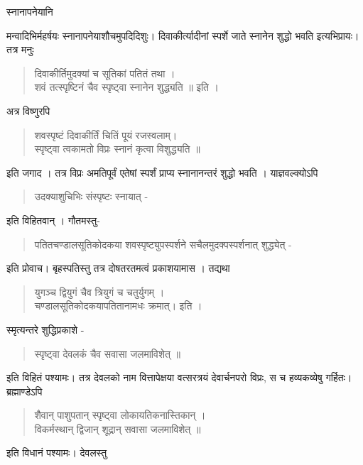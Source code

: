 स्नानापनेयानि \

मन्वादिभिर्महर्षयः स्नानापनेयाशौचमुपदिदिशुः। दिवाकीर्त्यादीनां स्पर्शे जाते स्नानेन शुद्धो भवति इत्यभिप्रायः। तत्र मनुः 
\begin{verse}
दिवाकीर्तिमुदक्यां च सूतिकां पतितं तथा ।\\
शवं तत्स्पृष्टिनं चैव स्पृष्ट्वा स्नानेन शुद्ध्यति ॥ इति । 
\end{verse}
अत्र विष्णुरपि 
\begin{verse}
शवस्पृष्टं दिवाकीर्तिं चितिं पूयं रजस्वलाम्।\\
स्पृष्ट्वा त्वकामतो विप्रः स्नानं कृत्वा विशुद्ध्यति ॥ 
\end{verse}
इति जगाद । तत्र विप्रः अमतिपूर्वं एतेषां स्पर्शं प्राप्य स्नानानन्तरं शुद्धो भवति । याज्ञवल्क्योऽपि 
\begin{verse}
उदक्याशुचिभिः संस्पृष्टः स्नायात् -
\end{verse}
इति विहितवान् । गौतमस्तु- 
\begin{verse}
पतितचण्डालसूतिकोदकया शवस्पृष्ट्युपस्पर्शने सचैलमुदक्पस्पर्शनात्  शुद्ध्येत् -
\end{verse}
इति प्रोवाच। बृहस्पतिस्तु तत्र दोषतरतमत्वं प्रकाशयामास । तद्यथा 
\begin{verse}
युगञ्च द्वियुगं चैव त्रियुगं च चतुर्युगम् । \\
चण्डालसूतिकोदकयापतितानामधः क्रमात्। इति । 
\end{verse}
स्मृत्यन्तरे शुद्धिप्रकाशे - 
\begin{verse}
स्पृष्ट्वा देवलकं चैव सवासा जलमाविशेत् ॥
\end{verse}
इति विहितं पश्यामः। तत्र देवलको नाम वित्तापेक्षया वत्सरत्रयं देवार्चनपरो विप्रः, स च हव्यकव्येषु गर्हितः। ब्रह्माण्डेऽपि 
\begin{verse}
शैवान् पाशुपतान् स्पृष्ट्वा लोकायतिकनास्तिकान् ।\\
विकर्मस्थान् द्विजान् शूद्रान् सवासा जलमाविशेत्  ॥ 
\end{verse}

इति विधानं पश्यामः।  देवलस्तु 

